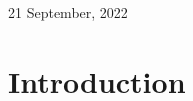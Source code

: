 \documentclass[landscape]{article}
\renewcommand{\today}{21 September, 2022}
\begin{document}
\centerline{\today}
\vfill

\clearpage

 
\hypertarget{INDEX}{}

\tableofcontents


%


\cp
\section{Introduction}
\vspace*{10mm}
\end{document}
